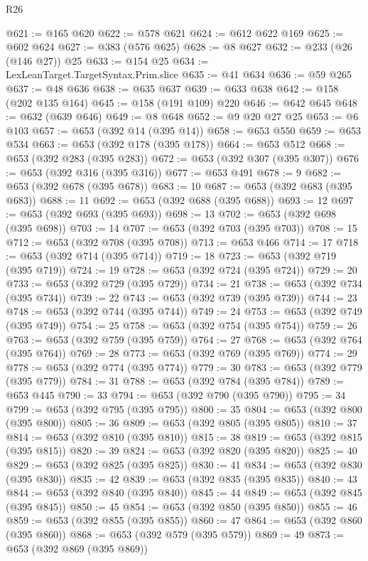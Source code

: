 \begin{lexlean}{R26}
\begin{coremodule}
@621 := @165 @620
@622 := @578 @621
@624 := @612 @622 @169
@625 := @602 @624
@627 := @383 (@576 @625)
@628 := @8 @627
@632 := @233 (@26 (@146 @27)) @25
@633 := @154 @25
@634 := LexLeanTarget.TargetSyntax.Prim.slice
@635 := @41 @634
@636 := @59 @265
@637 := @48 @636
@638 := @635 @637
@639 := @633 @638
@642 := @158 (@202 @135 @164)
@645 := @158 (@191 @109) @220
@646 := @642 @645
@648 := @632 (@639 @646)
@649 := @8 @648
@652 := @9 @20 @27 @25
@653 := @6 @103
@657 := @653 (@392 @14 (@395 @14))
@658 := @653 @550
@659 := @653 @534
@663 := @653 (@392 @178 (@395 @178))
@664 := @653 @512
@668 := @653 (@392 @283 (@395 @283))
@672 := @653 (@392 @307 (@395 @307))
@676 := @653 (@392 @316 (@395 @316))
@677 := @653 @491
@678 := 9
@682 := @653 (@392 @678 (@395 @678))
@683 := 10
@687 := @653 (@392 @683 (@395 @683))
@688 := 11
@692 := @653 (@392 @688 (@395 @688))
@693 := 12
@697 := @653 (@392 @693 (@395 @693))
@698 := 13
@702 := @653 (@392 @698 (@395 @698))
@703 := 14
@707 := @653 (@392 @703 (@395 @703))
@708 := 15
@712 := @653 (@392 @708 (@395 @708))
@713 := @653 @466
@714 := 17
@718 := @653 (@392 @714 (@395 @714))
@719 := 18
@723 := @653 (@392 @719 (@395 @719))
@724 := 19
@728 := @653 (@392 @724 (@395 @724))
@729 := 20
@733 := @653 (@392 @729 (@395 @729))
@734 := 21
@738 := @653 (@392 @734 (@395 @734))
@739 := 22
@743 := @653 (@392 @739 (@395 @739))
@744 := 23
@748 := @653 (@392 @744 (@395 @744))
@749 := 24
@753 := @653 (@392 @749 (@395 @749))
@754 := 25
@758 := @653 (@392 @754 (@395 @754))
@759 := 26
@763 := @653 (@392 @759 (@395 @759))
@764 := 27
@768 := @653 (@392 @764 (@395 @764))
@769 := 28
@773 := @653 (@392 @769 (@395 @769))
@774 := 29
@778 := @653 (@392 @774 (@395 @774))
@779 := 30
@783 := @653 (@392 @779 (@395 @779))
@784 := 31
@788 := @653 (@392 @784 (@395 @784))
@789 := @653 @445
@790 := 33
@794 := @653 (@392 @790 (@395 @790))
@795 := 34
@799 := @653 (@392 @795 (@395 @795))
@800 := 35
@804 := @653 (@392 @800 (@395 @800))
@805 := 36
@809 := @653 (@392 @805 (@395 @805))
@810 := 37
@814 := @653 (@392 @810 (@395 @810))
@815 := 38
@819 := @653 (@392 @815 (@395 @815))
@820 := 39
@824 := @653 (@392 @820 (@395 @820))
@825 := 40
@829 := @653 (@392 @825 (@395 @825))
@830 := 41
@834 := @653 (@392 @830 (@395 @830))
@835 := 42
@839 := @653 (@392 @835 (@395 @835))
@840 := 43
@844 := @653 (@392 @840 (@395 @840))
@845 := 44
@849 := @653 (@392 @845 (@395 @845))
@850 := 45
@854 := @653 (@392 @850 (@395 @850))
@855 := 46
@859 := @653 (@392 @855 (@395 @855))
@860 := 47
@864 := @653 (@392 @860 (@395 @860))
@868 := @653 (@392 @579 (@395 @579))
@869 := 49
@873 := @653 (@392 @869 (@395 @869))

\end{coremodule}
\end{lexlean}

